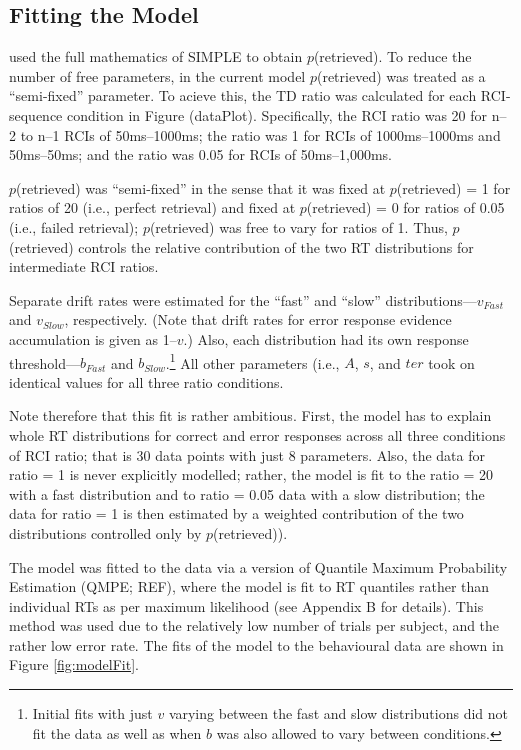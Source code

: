 \documentclass[a4paper, jou, natbib]{apa6}
\begin{document}
\subsection{Fitting the Model}

\citet{Grange2015} used the full mathematics of SIMPLE to obtain $p$(retrieved). To reduce the number of free parameters, in the current model $p$(retrieved) was treated as a ``semi-fixed'' parameter. To acieve this, the TD ratio was calculated for each RCI-sequence condition in Figure (dataPlot). Specifically, the RCI ratio was 20 for n--2 to n--1 RCIs of 50ms--1000ms; the ratio was 1 for RCIs of 1000ms--1000ms and 50ms--50ms; and the ratio was 0.05 for RCIs of 50ms--1,000ms. 

$p$(retrieved) was ``semi-fixed'' in the sense that it was fixed at $p$(retrieved) = 1 for ratios of 20 (i.e., perfect retrieval) and fixed at $p$(retrieved) = 0 for ratios of 0.05 (i.e., failed retrieval); $p$(retrieved) was free to vary for ratios of 1. Thus, $p$(retrieved) controls the relative contribution of the two RT distributions for intermediate RCI ratios.

Separate drift rates were estimated for the ``fast'' and ``slow'' distributions---$v_{Fast}$ and $v_{Slow}$, respectively. (Note that drift rates for error response evidence accumulation is given as 1--$v$.) Also, each distribution had its own response threshold---$b_{Fast}$ and $b_{Slow}$.\footnote{Initial fits with just $v$ varying between the fast and slow distributions did not fit the data as well as when $b$ was also allowed to vary between conditions.} All other parameters (i.e., $A$, $s$, and $ter$ took on identical values for all three ratio conditions. 

Note therefore that this fit is rather ambitious. First, the model has to explain whole RT distributions for correct and error responses across all three conditions of RCI ratio; that is 30 data points with just 8 parameters. Also, the data for ratio = 1 is never explicitly modelled; rather, the model is fit to the ratio = 20 with a fast distribution and to ratio = 0.05 data with a slow distribution; the data for ratio = 1 is then estimated by a weighted contribution of the two distributions controlled only by $p$(retrieved)). 

The model was fitted to the data via a version of Quantile Maximum Probability Estimation (QMPE; REF), where the model is fit to RT quantiles rather than individual RTs as per maximum likelihood (see Appendix B for details). This method was used due to the relatively low number of trials per subject, and the rather low error rate. The fits of the model to the behavioural data are shown in Figure \ref{fig:modelFit}. 
\end{document}
